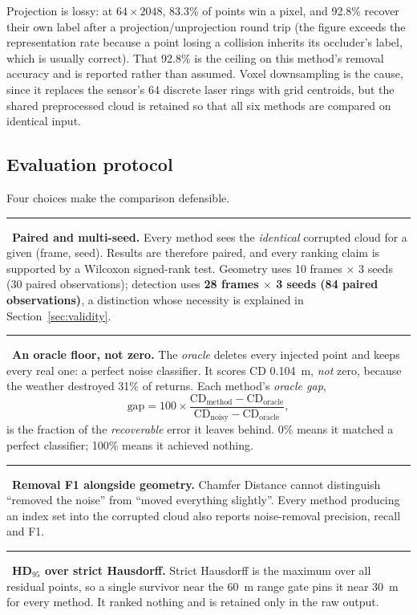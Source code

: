 \documentclass[11pt,a4paper]{article}
\newcommand{\keyfinding}[1]{\medskip\noindent\textcolor{accent}{\rule{2pt}{10pt}}\ \textbf{#1}\medskip}
\begin{document}
Projection is lossy: at $64\times2048$, 83.3\% of points win a pixel, and
92.8\% recover their own label after a projection/unprojection round trip
(the figure exceeds the representation rate because a point losing a
collision inherits its occluder's label, which is usually correct). That
92.8\% is the ceiling on this method's removal accuracy and is reported
rather than assumed. Voxel downsampling is the cause, since it replaces the
sensor's 64 discrete laser rings with grid centroids, but the shared
preprocessed cloud is retained so that all six methods are compared on
identical input.

\subsection{Evaluation protocol}
\label{sec:protocol}

Four choices make the comparison defensible.

\keyfinding{Paired and multi-seed.}
Every method sees the \emph{identical} corrupted cloud for a given (frame,
seed). Results are therefore paired, and every ranking claim is supported by
a Wilcoxon signed-rank test. Geometry uses 10 frames $\times$ 3 seeds (30
paired observations); detection uses \textbf{28 frames $\times$ 3 seeds (84
paired observations)}, a distinction whose necessity is explained in
Section~\ref{sec:validity}.

\keyfinding{An oracle floor, not zero.}
\label{sec:oracle}
The \emph{oracle} deletes every injected point and keeps every real one:
a perfect noise classifier. It scores CD 0.104~m, \emph{not} zero, because
the weather destroyed 31\% of returns. Each method's \emph{oracle gap},
\[
\text{gap} = 100 \times
\frac{\mathrm{CD}_{\text{method}} - \mathrm{CD}_{\text{oracle}}}
     {\mathrm{CD}_{\text{noisy}} - \mathrm{CD}_{\text{oracle}}},
\]
is the fraction of the \emph{recoverable} error it leaves behind. 0\% means
it matched a perfect classifier; 100\% means it achieved nothing.

\keyfinding{Removal F1 alongside geometry.}
Chamfer Distance cannot distinguish ``removed the noise'' from ``moved
everything slightly''. Every method producing an index set into the corrupted
cloud also reports noise-removal precision, recall and F1.

\keyfinding{HD$_{95}$ over strict Hausdorff.}
Strict Hausdorff is the maximum over all residual points, so a single
survivor near the 60~m range gate pins it near 30~m for every method. It
ranked nothing and is retained only in the raw output.
\end{document}
